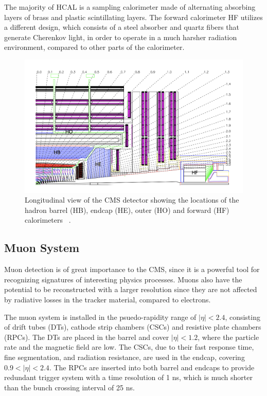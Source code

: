 The majority of HCAL is a sampling calorimeter made of alternating absorbing layers of brass and plastic scintillating layers. 
The forward calorimeter HF utilizes a different design, which consists of a steel absorber and quartz fibers that generate Cherenkov light, 
in order to operate in a much harsher radiation environment, compared to other parts of the calorimeter.

\begin{figure}
    \begin{minipage}[t]{\linewidth}\centering
        \includegraphics[width=15cm]{hcal_layout.png}
    \end{minipage}
    \caption{Longitudinal view of the CMS detector showing the locations of the hadron barrel (HB), endcap (HE), outer (HO) 
    and forward (HF) calorimeters ~\cite{cms:cms_experiment}.}
    \label{fig:hcal_layout}
\end{figure}

\subsection{Muon System}

Muon detection is of great importance to the CMS, since it is a powerful tool for recognizing signatures of interesting physics processes. Muons also have the
potential to be reconstructed with a larger resolution since they are not affected by radiative losses in the tracker material, compared to electrons. 

The muon system is installed in the psuedo-rapidity range of $|\eta| < 2.4$, consisting of drift tubes (DTs), cathode strip chambers (CSCs) and 
resistive plate chambers (RPCs). The DTs are placed in the barrel and cover $|\eta| < 1.2$, where the particle rate and the 
magnetic field are low. The CSCs, due to their fast response time, fine segmentation, and radiation resistance, are used in the endcap, covering
$0.9 < |\eta| < 2.4$. The RPCs are inserted into both barrel and endcaps to provide redundant trigger system with a time resolution of 1 ns, 
which is much shorter than the bunch crossing interval of 25 ns.

